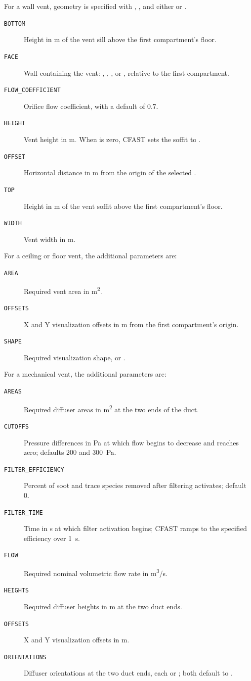 {{For a wall vent, geometry is specified with , , and either  or .
\begin{description}
\item[\texttt{BOTTOM}] Height in m of the vent sill above the first compartment's floor.
\item[\texttt{FACE}] Wall containing the vent: , , , or , relative to the first compartment.
\item[\texttt{FLOW\_COEFFICIENT}] Orifice flow coefficient, with a default of 0.7.
\item[\texttt{HEIGHT}] Vent height in m. When  is zero, CFAST sets the soffit to .
\item[\texttt{OFFSET}] Horizontal distance in m from the origin of the selected .
\item[\texttt{TOP}] Height in m of the vent soffit above the first compartment's floor.
\item[\texttt{WIDTH}] Vent width in m.
\end{description}

For a ceiling or floor vent, the additional parameters are:
\begin{description}
\item[\texttt{AREA}] Required vent area in \unit{m^2}.
\item[\texttt{OFFSETS}] X and Y visualization offsets in m from the first compartment's origin.
\item[\texttt{SHAPE}] Required visualization shape,  or .
\end{description}

For a mechanical vent, the additional parameters are:
\begin{description}
\item[\texttt{AREAS}] Required diffuser areas in \unit{m^2} at the two ends of the duct.
\item[\texttt{CUTOFFS}] Pressure differences in Pa at which flow begins to decrease and reaches zero; defaults 200 and 300~\unit{Pa}.
\item[\texttt{FILTER\_EFFICIENCY}] Percent of soot and trace species removed after filtering activates; default 0.
\item[\texttt{FILTER\_TIME}] Time in s at which filter activation begins; CFAST ramps to the specified efficiency over 1~s.
\item[\texttt{FLOW}] Required nominal volumetric flow rate in \unit{m^3/s}.
\item[\texttt{HEIGHTS}] Required diffuser heights in m at the two duct ends.
\item[\texttt{OFFSETS}] X and Y visualization offsets in m.
\item[\texttt{ORIENTATIONS}] Diffuser orientations at the two duct ends, each  or ; both default to .
\end{description}






}}
